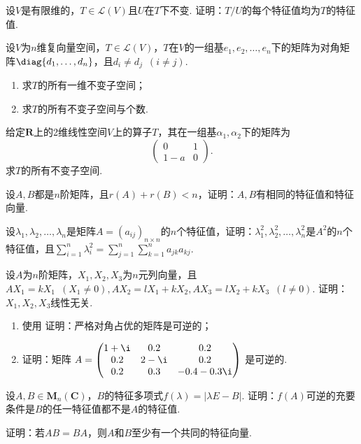 \begin{exercise}
\begin{exgroup}
        \item 设$V$是有限维的，$T\in \mathcal{L}(V)$且$U$在$T$下不变. 证明：$T/U$的每个特征值均为$T$的特征值.

        \item 设$V$为$n$维复向量空间，$T\in \mathcal{L}(V)$，$T$在$V$的一组基$e_1,e_2,\ldots,e_n$下的矩阵为对角矩阵$\diag\{d_1,\ldots,d_n\}$，且$d_i\neq d_j\enspace(i\neq j)$.
        \begin{enumerate}
            \item 求$T$的所有一维不变子空间；

            \item 求$T$的所有不变子空间与个数.
        \end{enumerate}

        \item 给定$\mathbf{R}$上的2维线性空间$V$上的算子$T$，其在一组基$\alpha_1,\alpha_2$下的矩阵为
        \[\begin{pmatrix}
                0 & 1 \\ 1-a & 0
            \end{pmatrix}.\]
        求$T$的所有不变子空间.

        \item 设$A,B$都是$n$阶矩阵，且$r(A)+r(B)<n$，证明：$A,B$有相同的特征值和特征向量.

        \item 设$\lambda_1,\lambda_2,\ldots,\lambda_n$是矩阵$A=(a_{ij})_{n\times n}$的$n$个特征值，证明：$\lambda_1^2,\lambda_2^2,\ldots,\lambda_n^2$是$A^2$的$n$个特征值，且$\displaystyle\sum_{i=1}^{n}\lambda_i^2=\sum_{j=1}^{n}\displaystyle\sum_{k=1}^{n}a_{jk}a_{kj}$.

        \item 设$A$为$n$阶矩阵，$X_1,X_2,X_3$为$n$元列向量，且$AX_1=kX_1\enspace(X_1\neq 0),AX_2=lX_1+kX_2,AX_3=lX_2+kX_3\enspace(l\neq 0)$. 证明：$X_1,X_2,X_3$线性无关.

        \item \begin{enumerate}
            \item 使用  证明：严格对角占优的矩阵是可逆的；
            \item 证明：矩阵 $A = \begin{pmatrix}
                          1 + \i & 0.2    & 0.2          \\
                          0.2    & 2 - \i & 0.2          \\
                          0.2    & 0.3    & -0.4 - 0.3\i
                      \end{pmatrix}
                  $ 是可逆的.
        \end{enumerate}
    \end{exgroup}

    \begin{exgroup}
        \item 设$A,B\in \mathbf{M}_n(\mathbf{C})$，$B$的特征多项式$f(\lambda)=|\lambda E-B|$. 证明：$f(A)$可逆的充要条件是$B$的任一特征值都不是$A$的特征值.

        \item 证明：若$AB=BA$，则$A$和$B$至少有一个共同的特征向量.
    \end{exgroup}
\end{exercise}
